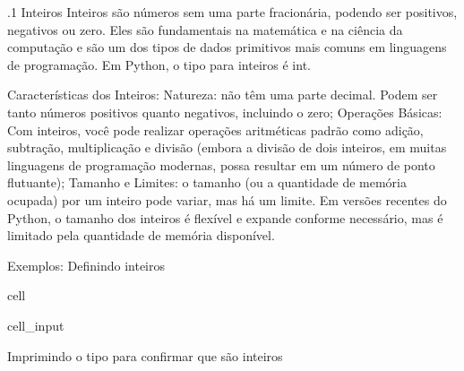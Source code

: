 \documentclass[letterpaper,10pt,english]{jupyterBook}
\begin{document}
.1 Inteiros
Inteiros são números sem uma parte fracionária, podendo ser positivos, negativos ou zero. Eles são fundamentais na matemática e na ciência da computação e são um dos tipos de dados primitivos mais comuns em linguagens de programação. Em Python, o tipo para inteiros é int.

\sphinxAtStartPar
Características dos Inteiros:
Natureza: não têm uma parte decimal. Podem ser tanto números positivos quanto negativos, incluindo o zero;
Operações Básicas: Com inteiros, você pode realizar operações aritméticas padrão como adição, subtração, multiplicação e divisão (embora a divisão de dois inteiros, em muitas linguagens de programação modernas, possa resultar em um número de ponto flutuante);
Tamanho e Limites: o tamanho (ou a quantidade de memória ocupada) por um inteiro pode variar, mas há um limite. Em versões recentes do Python, o tamanho dos inteiros é flexível e expande conforme necessário, mas é limitado pela quantidade de memória disponível.

\sphinxAtStartPar
Exemplos:
Definindo inteiros

\begin{sphinxuseclass}{cell}\begin{sphinxVerbatimInput}

\begin{sphinxuseclass}{cell_input}
\begin{sphinxVerbatim}[commandchars=\\\{\}]
  
  
  
\end{sphinxVerbatim}

\end{sphinxuseclass}\end{sphinxVerbatimInput}

\end{sphinxuseclass}
\sphinxAtStartPar
Imprimindo o tipo para confirmar que são inteiros
\end{document}
